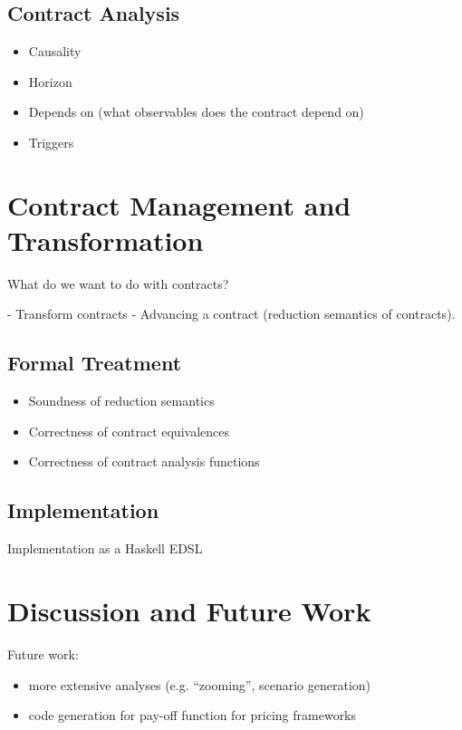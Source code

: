 \documentclass[a4paper,debug,twocolumn]{easychair}
\begin{document}
\subsection{Contract Analysis}
\label{sec:contract-analysis}

\begin{itemize}
\item Causality
\item Horizon
\item Depends on (what observables does the contract depend on)
\item Triggers
\end{itemize}


\section{Contract Management and Transformation}
\label{sec:contract-management}

What do we want to do with contracts?

- Transform contracts
- Advancing a contract (reduction semantics of contracts).

\subsection{Formal Treatment}
\label{sec:properties}

\begin{itemize}
\item Soundness of reduction semantics
\item Correctness of contract equivalences
\item Correctness of contract analysis functions
\end{itemize}


\subsection{Implementation}
\label{sec:implementation}

Implementation as a Haskell EDSL

\section{Discussion and Future Work}
\label{sec:disc-future-work}

Future work:
\begin{itemize}
\item more extensive analyses (e.g. ``zooming'', scenario generation)
\item code generation for pay-off function for pricing frameworks
\end{itemize}







\end{document}
